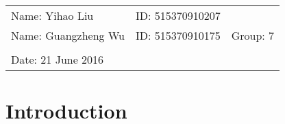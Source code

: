 \documentclass{article}
\begin{document}
\vspace*{0.25cm}

\hrulefill

\thispagestyle{empty}

\begin{center}
\begin{large}
\end{large}

\hrulefill

\vspace*{5cm}
\begin{Large}
\end{Large}

\vspace{2em}

\begin{large}
\end{large}
\end{center}


\vfill

\begin{table}[h!]
\flushleft
\begin{tabular}{lll}
Name: Yihao Liu \hspace*{2em}&
ID: 515370910207\hspace*{2em}\\
Name: Guangzheng Wu \hspace*{2em}&
ID: 515370910175\hspace*{2em}
& Group: 7\\


\\

Date: 21 June 2016 

\end{tabular}
\end{table}

\hfill
\begin{tiny}
[rev. 1.0]
\end{tiny}
\newpage

\section{Introduction}
\end{document}
